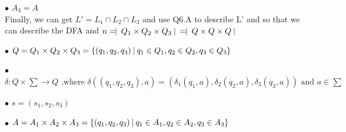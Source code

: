 \documentclass[12pt,a4paper]{article}
\begin{document}
	$\bullet$ $A_3 = A$\\
	
	Finally, we can get $L' = L_1 \cap L_2 \cap L_3$ and use Q6.A to describe L' and so that we can describe the DFA and $n= \vline\ Q_1 \times Q_2 \times Q_3 \ \vline\ = \vline\ Q \times Q \times Q \ \vline\ $
	
	$\bullet$ $Q = Q_1 \times Q_2 \times Q_3 = \{(q_1,q_2,q_3)\ \vline\ q_1 \in Q_1, q_2 \in Q_2, q_3 \in Q_3\}$

	$\bullet$ $\delta:Q \times \sum \rightarrow Q \mbox{ ,where } \delta((q_1,q_2,q_3),a) = (\delta_1(q_1,a),\delta_2(q_2,a),\delta_3(q_3,a)) \mbox{ and } a \in \sum$

	$\bullet$ $s = (s_1,s_2,s_3)$

	$\bullet$ $A = A_1 \times A_2 \times A_3 = \{(q_1,q_2,q_3)\ \vline\ q_1 \in A_1, q_2 \in A_2, q_3 \in A_3\}$
\end{document}
